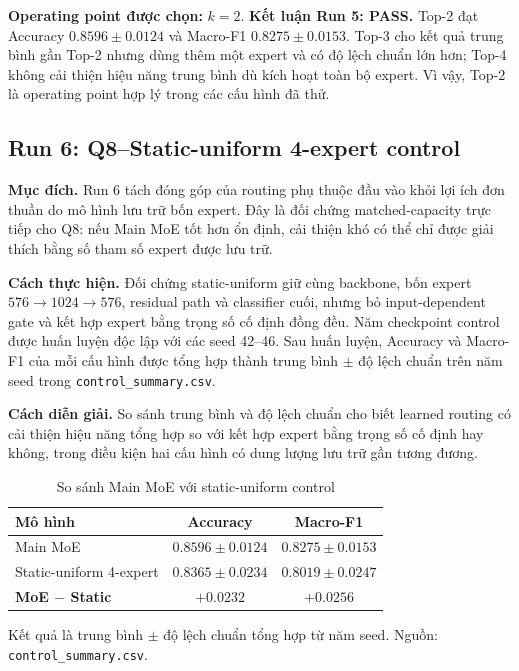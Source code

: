 \documentclass[conference]{IEEEtran}
\newcommand{\meanstd}{trung bình $\pm$ độ lệch chuẩn}
\begin{document}
\textbf{Operating point được chọn:} $k=2$. \textbf{Kết luận Run 5: PASS.}
Top-2 đạt Accuracy $0.8596\pm0.0124$ và Macro-F1 $0.8275\pm0.0153$. Top-3
cho kết quả trung bình gần Top-2 nhưng dùng thêm một expert và có độ lệch
chuẩn lớn hơn; Top-4 không cải thiện hiệu năng trung bình dù kích hoạt toàn
bộ expert. Vì vậy,
Top-2 là operating point hợp lý trong các cấu hình đã thử.

\subsection{Run 6: Q8--Static-uniform 4-expert control}

\textbf{Mục đích.} Run 6 tách đóng góp của routing phụ thuộc đầu vào khỏi lợi
ích đơn thuần do mô hình lưu trữ bốn expert. Đây là đối chứng matched-capacity
trực tiếp cho Q8: nếu Main MoE tốt hơn ổn định, cải thiện khó có thể chỉ được
giải thích bằng số tham số expert được lưu trữ.

\textbf{Cách thực hiện.} Đối chứng static-uniform giữ cùng backbone, bốn
expert $576\rightarrow1024\rightarrow576$, residual path và classifier cuối,
nhưng bỏ input-dependent gate và kết hợp expert bằng trọng số cố định đồng
đều. Năm checkpoint control được huấn luyện độc lập với các seed 42--46.
Sau huấn luyện, Accuracy và Macro-F1 của mỗi cấu hình được tổng hợp thành
trung bình $\pm$ độ lệch chuẩn trên năm seed trong
\texttt{control\_summary.csv}.

\textbf{Cách diễn giải.} So sánh trung bình và độ lệch chuẩn cho biết learned
routing có cải thiện hiệu năng tổng hợp so với kết hợp expert bằng trọng số
cố định hay không, trong điều kiện hai cấu hình có dung lượng lưu trữ gần
tương đương.

\begin{table}[H]
\caption{So sánh Main MoE với static-uniform control}
\label{tab:static-summary}
\centering
\footnotesize
\begin{tabular}{@{}lcc@{}}
\toprule
Mô hình & Accuracy & Macro-F1 \\
\midrule
Main MoE & \textbf{$0.8596\pm0.0124$} & \textbf{$0.8275\pm0.0153$} \\
Static-uniform 4-expert & $0.8365\pm0.0234$ & $0.8019\pm0.0247$ \\
\textbf{MoE $-$ Static} & \textbf{$+0.0232$} & \textbf{$+0.0256$} \\
\bottomrule
\end{tabular}
\vspace{2pt}

\raggedright\scriptsize Kết quả là \meanstd{} tổng hợp từ năm seed. Nguồn:
\texttt{control\_summary.csv}.
\end{table}
\end{document}

